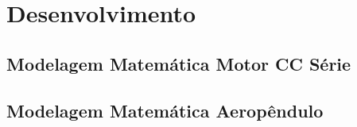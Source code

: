
\chapter{Desenvolvimento}
\label{ch:desenv}

\section{Modelagem Matemática Motor CC Série}

\section{Modelagem Matemática Aeropêndulo}